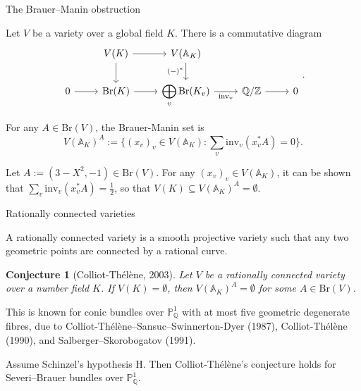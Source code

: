 \documentclass[10pt]{beamer}
\newtheorem{conjecture}{Conjecture}
\begin{document}
\begin{frame}[t]{The Brauer--Manin obstruction}

Let $ V $ be a variety over a global field $ K $. There is a commutative diagram
$$
\begin{tikzcd}[ampersand replacement=\&]
\& V(K) \arrow{r} \arrow{d} \& V(\mathbb{A}_K) \arrow{d}[swap]{(-)^*} \& \& \\
0 \arrow{r} \& \mathrm{Br}(K) \arrow{r} \& \displaystyle\bigoplus_v \mathrm{Br}(K_v) \arrow{r}[swap]{\mathrm{inv}_v} \& \mathbb{Q} / \mathbb{Z} \arrow{r} \& 0
\end{tikzcd}.
$$

\pause

\vspace{0.5cm} For any $ A \in \mathrm{Br}(V) $, the Brauer-Manin set is
$$ V(\mathbb{A}_K)^A := \{(x_v)_v \in V(\mathbb{A}_K) : \textstyle\sum_v \mathrm{inv}_v(x_v^*A) = 0\}. $$

\pause

\vspace{0.5cm}

\begin{example}[Iskovskikh, 1971]
Let $ A := (3 - X^2, -1) \in \mathrm{Br}(V) $. For any $ (x_v)_v \in V(\mathbb{A}_K) $, it can be shown that $ \textstyle\sum_v \mathrm{inv}_v(x_v^*A) = \tfrac{1}{2} $, so that $ V(K) \subseteq V(\mathbb{A}_K)^A = \emptyset $.
\end{example}

\end{frame}

\begin{frame}[t]{Rationally connected varieties}

A rationally connected variety is a smooth projective variety such that any two geometric points are connected by a rational curve.

\pause

\vspace{0.5cm}

\begin{conjecture}[Colliot-Th\'el\`ene, 2003]
Let $ V $ be a rationally connected variety over a number field $ K $. If $ V(K) = \emptyset $, then $ V(\mathbb{A}_K)^A = \emptyset $ for some $ A \in \mathrm{Br}(V) $.
\end{conjecture}

\pause

\vspace{0.5cm} This is known for conic bundles over $ \mathbb{P}_\mathbb{Q}^1 $ with at most five geometric degenerate fibres, due to Colliot-Th\'el\`ene--Sansuc--Swinnerton-Dyer (1987), Colliot-Th\'el\`ene (1990), and Salberger--Skorobogatov (1991).

\pause

\vspace{0.5cm}

\begin{theorem}
Assume Schinzel's hypothesis H. Then Colliot-Th\'el\`ene's conjecture holds for Severi--Brauer bundles over $ \mathbb{P}_\mathbb{Q}^1 $.
\end{theorem}

\end{frame}
\end{document}
